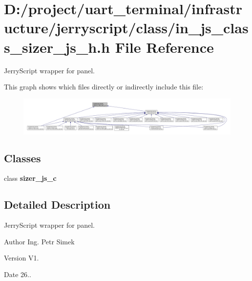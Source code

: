 \section{D\+:/project/uart\+\_\+terminal/infrastructure/jerryscript/class/in\+\_\+js\+\_\+class\+\_\+sizer\+\_\+js\+\_\+h.h File Reference}
\label{in__js__class__sizer__js__h_8h}


Jerry\+Script wrapper for panel.  


This graph shows which files directly or indirectly include this file\+:
\nopagebreak
\begin{figure}[H]
\begin{center}
\leavevmode
\includegraphics[width=350pt]{in__js__class__sizer__js__h_8h__dep__incl}
\end{center}
\end{figure}
\subsection*{Classes}
\begin{DoxyCompactItemize}
\item 
class \textbf{ sizer\+\_\+js\+\_\+c}
\end{DoxyCompactItemize}


\subsection{Detailed Description}
Jerry\+Script wrapper for panel. 

\begin{DoxyAuthor}{Author}
Ing. Petr Simek 
\end{DoxyAuthor}
\begin{DoxyVersion}{Version}
V1. 
\end{DoxyVersion}
\begin{DoxyDate}{Date}
26.. 
\end{DoxyDate}

